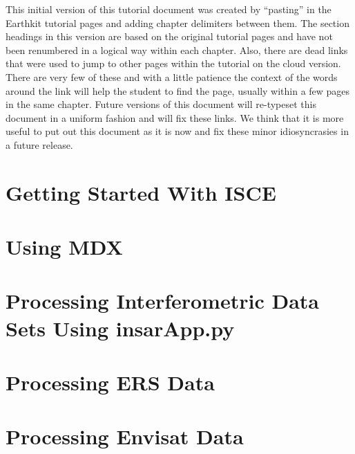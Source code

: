 \documentclass[11pt]{book}
\begin{document}
This initial version of this tutorial document was created by ``pasting'' in the Earthkit tutorial
pages and adding chapter delimiters between them.  The section headings in this version are based on
the original tutorial pages and have not been renumbered in a logical way within each chapter.  Also,
there are dead links that were used to jump to other pages within the tutorial on the cloud version.
There are very few of these and with a little patience the context of the words around the link will
help the student to find the page, usually within a few pages in the same chapter.  Future versions
of this document will re-typeset this document in a uniform fashion and will fix these links.  We think
that it is more useful to put out this document as it is now and fix these minor idiosyncrasies in a
future release.




\chapter{Getting Started With ISCE}



\chapter{Using MDX}


\chapter{Processing Interferometric Data Sets Using insarApp.py}







\chapter{Processing ERS Data}



\chapter{Processing Envisat Data}

\end{document}

